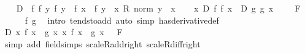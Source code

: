 \begin{isabellebody}
\ \ \isamarkupfalse%
\ {\isacharquery}{\kern0pt}D\ {\isacharequal}{\kern0pt}\ {\isachardoublequoteopen}{\isasymlambda}f\ f{\isacharprime}{\kern0pt}\ y{\isachardot}{\kern0pt}\ {\isacharparenleft}{\kern0pt}{\isacharparenleft}{\kern0pt}f\ y\ {\isacharminus}{\kern0pt}\ f\ {\isacharquery}{\kern0pt}x{\isacharparenright}{\kern0pt}\ {\isacharminus}{\kern0pt}\ f{\isacharprime}{\kern0pt}\ {\isacharparenleft}{\kern0pt}y\ {\isacharminus}{\kern0pt}\ {\isacharquery}{\kern0pt}x{\isacharparenright}{\kern0pt}{\isacharparenright}{\kern0pt}\ {\isacharslash}{\kern0pt}\isactrlsub R\ norm\ {\isacharparenleft}{\kern0pt}y\ {\isacharminus}{\kern0pt}\ {\isacharquery}{\kern0pt}x{\isacharparenright}{\kern0pt}{\isachardoublequoteclose}\isanewline
\ \ \isamarkupfalse%
\ {\isachardoublequoteopen}{\isacharparenleft}{\kern0pt}{\isacharparenleft}{\kern0pt}{\isasymlambda}x{\isachardot}{\kern0pt}\ {\isacharquery}{\kern0pt}D\ f\ f{\isacharprime}{\kern0pt}\ x\ {\isacharplus}{\kern0pt}\ {\isacharquery}{\kern0pt}D\ g\ g{\isacharprime}{\kern0pt}\ x{\isacharparenright}{\kern0pt}\ {\isasymlonglongrightarrow}\ {\isacharparenleft}{\kern0pt}{}\ {\isacharplus}{\kern0pt}\ {}{\isacharparenright}{\kern0pt}{\isacharparenright}{\kern0pt}\ F{\isachardoublequoteclose}\isanewline
\ \ \ \ \isamarkupfalse%
\ f\ g\ \isamarkupfalse%
\ {\isacharparenleft}{\kern0pt}intro\ tendsto{\isacharunderscore}{\kern0pt}add{\isacharparenright}{\kern0pt}\ {\isacharparenleft}{\kern0pt}auto\ simp{\isacharcolon}{\kern0pt}\ has{\isacharunderscore}{\kern0pt}derivative{\isacharunderscore}{\kern0pt}def{\isacharparenright}{\kern0pt}\isanewline
\ \ \isamarkupfalse%
\ \isamarkupfalse%
\ {\isachardoublequoteopen}{\isacharparenleft}{\kern0pt}{\isacharquery}{\kern0pt}D\ {\isacharparenleft}{\kern0pt}{\isasymlambda}x{\isachardot}{\kern0pt}\ f\ x\ {\isacharplus}{\kern0pt}\ g\ x{\isacharparenright}{\kern0pt}\ {\isacharparenleft}{\kern0pt}{\isasymlambda}x{\isachardot}{\kern0pt}\ f{\isacharprime}{\kern0pt}\ x\ {\isacharplus}{\kern0pt}\ g{\isacharprime}{\kern0pt}\ x{\isacharparenright}{\kern0pt}\ {\isasymlonglongrightarrow}\ {}{\isacharparenright}{\kern0pt}\ F{\isachardoublequoteclose}\isanewline
\ \ \ \ \isamarkupfalse%
\ {\isacharparenleft}{\kern0pt}simp\ add{\isacharcolon}{\kern0pt}\ field{\isacharunderscore}{\kern0pt}simps\ scaleR{\isacharunderscore}{\kern0pt}add{\isacharunderscore}{\kern0pt}right\ scaleR{\isacharunderscore}{\kern0pt}diff{\isacharunderscore}{\kern0pt}right{\isacharparenright}{\kern0pt}\isanewline

\end{isabellebody}
